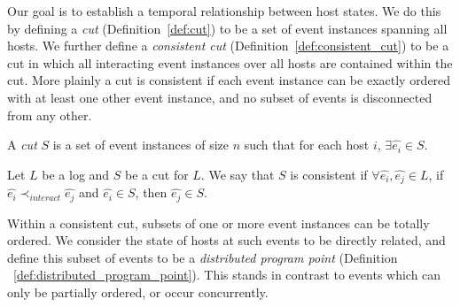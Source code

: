 
Our goal is to establish a temporal relationship between host states.
We do this by defining a \textit{cut} (Definition~\ref{def:cut}) to be
a set of event instances spanning all hosts. We further define a
\textit{consistent cut} (Definition~\ref{def:consistent_cut}) to be a
cut in which all interacting event instances over all hosts are
contained within the cut.  More plainly a cut is consistent if each
event instance can be exactly ordered with at least one other event
instance, and no subset of events is disconnected from any other.


\begin{definition}[Cut] 
  \label{def:cut}
  A \textit{cut} $S$ is a set of event instances of size $n$ such that
  for each host $i$, $\exists \hat{e_i} \in S$.
\end{definition}

\begin{definition}
  \label{def:consistent_cut}
  Let $L$ be a log and $S$ be a cut for $L$. We say that $S$ is consistent if $\forall
  \hat{e_i}, \hat{e_j} \in L$, if $\hat{e_i} \prec_{interact}
  \hat{e_j}$ and $\hat{e_i} \in S$, then $\hat{e_j} \in S$.
\end{definition}


Within a consistent cut, subsets of one or more event instances
can be totally ordered.
We consider the state of hosts at such events
to be directly related, and define this subset of events to be a
\textit{distributed program point} (Definition
~\ref{def:distributed_program_point}). This stands in contrast to
events which can only be partially ordered, or occur concurrently.

